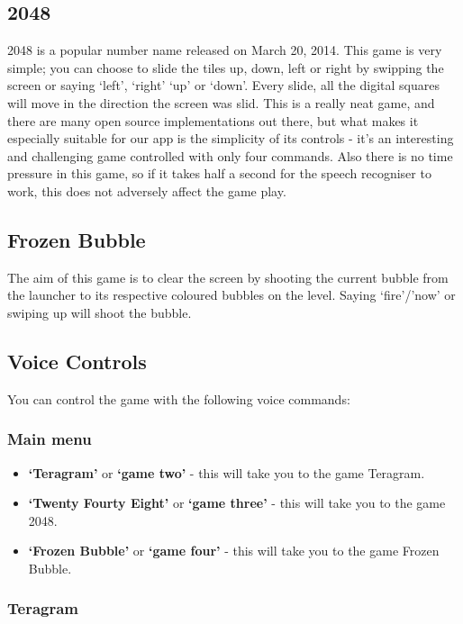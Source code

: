 \documentclass[11pt, oneside]{article}
\begin{document}
\subsection{2048}

2048 is a popular number name released on March 20, 2014. This game is
very simple; you can choose to slide the tiles up, down, left or right
by swipping the screen or saying `left', `right' `up' or `down'. Every
slide, all the digital squares will move in the direction the screen was slid. 
This is a really neat game, and there are many open source
implementations out there, but what makes it especially suitable for
our app is the simplicity of its controls - it's an interesting and
challenging game controlled with only four commands. Also there is no
time pressure in this game, so if it takes half a second for the
speech recogniser to work, this does not adversely affect the game
play.

\subsection{Frozen Bubble}
The aim of this game is to clear the screen by shooting the current
bubble from the launcher to its respective coloured bubbles on the
level. Saying `fire'/'now' or swiping up will shoot the bubble.

\subsection{Voice Controls}

You can control the game with the following voice commands:

\subsubsection{Main menu}

\begin{itemize}
  \item {\bf`Teragram'} or {\bf`game two'}  - this will take you to the game Teragram.
  \item {\bf`Twenty Fourty Eight'} or {\bf`game three'} - this will take you to the game 2048.
  \item {\bf`Frozen Bubble'} or {\bf`game four'} - this will take you to the game Frozen Bubble.
\end{itemize}

\subsubsection{Teragram}
\end{document}
